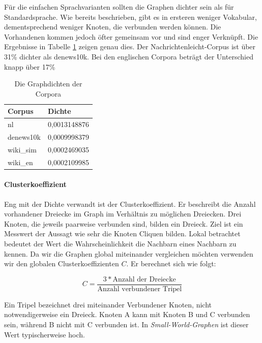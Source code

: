 \documentclass[12pt, a4paper]{article}
\begin{document}
Für die einfachen Sprachvarianten sollten die Graphen dichter sein als für
Standardsprache.
Wie bereits beschrieben, gibt es in ersteren weniger Vokabular, dementsprechend
weniger Knoten, die verbunden werden können. Die Vorhandenen kommen jedoch öfter 
gemeinsam vor und sind enger Verknüpft. Die Ergebnisse in Tabelle \ref{density_table}
zeigen genau dies. Der Nachrichtenleicht-Corpus ist über 31\% dichter als denews10k.
Bei den englischen Corpora beträgt der Unterschied knapp über 17\%

\begin{table}[h]
  \centering
  \begin{tabular}{l|l}
    Corpus            & Dichte          \\
    \hline
    nl                &  		0,0013148876 \\
    denews10k         &  		0,0009998379 \\
    wiki\_sim         &  		0,0002469035 \\
    wiki\_en          &  		0,0002109985 \\
  \end{tabular}
  \caption{\label{density_table} Die Graphdichten der Corpora}
\end{table}

\paragraph{Clusterkoeffizient}

Eng mit der Dichte verwandt ist der Clusterkoeffizient. Er beschreibt die
Anzahl vorhandener Dreiecke im Graph im Verhältnis zu möglichen Dreiecken. Drei
Knoten, die jeweils paarweise verbunden sind, bilden ein Dreieck. Ziel ist ein
Messwert der Aussagt wie sehr die Knoten Cliquen bilden. Lokal betrachtet
bedeutet der Wert die Wahrscheinlichkeit die Nachbarn eines Nachbarn zu kennen.
Da wir die Graphen global miteinander vergleichen möchten verwenden wir den
globalen Clusterkoeffizienten $C$. Er berechnet sich wie folgt:

$$
    C = \frac{3*\text{Anzahl der Dreiecke}}{\text{Anzahl verbundener Tripel}}
$$

Ein Tripel bezeichnet drei miteinander Verbundener Knoten, nicht
notwendigerweise ein Dreieck. Knoten A kann mit Knoten B und C verbunden sein,
während B nicht mit C verbunden ist. In \emph{Small-World-Graphen} ist dieser
Wert typischerweise hoch. 


\end{document}
